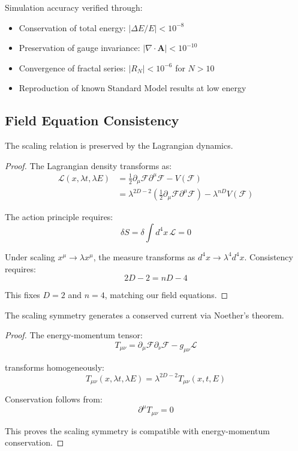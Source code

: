 \documentclass{article}
\begin{document}
Simulation accuracy verified through:

\begin{itemize}
\item Conservation of total energy: $|\Delta E/E| < 10^{-8}$
\item Preservation of gauge invariance: $|\nabla \cdot \mathbf{A}| < 10^{-10}$
\item Convergence of fractal series: $|R_N| < 10^{-6}$ for $N > 10$
\item Reproduction of known Standard Model results at low energy
\end{itemize}

\subsection{Field Equation Consistency}

\begin{theorem}
The scaling relation is preserved by the Lagrangian dynamics.
\end{theorem}

\begin{proof}
The Lagrangian density transforms as:
\begin{align*}
\mathcal{L}(x, \lambda t, \lambda E) &= \frac{1}{2}\partial_\mu\mathcal{F}\partial^\mu\mathcal{F} - V(\mathcal{F}) \\
&= \lambda^{2D-2}\left(\frac{1}{2}\partial_\mu\mathcal{F}\partial^\mu\mathcal{F}\right) - \lambda^{nD}V(\mathcal{F})
\end{align*}

The action principle requires:
\[
\delta S = \delta\int d^4x\, \mathcal{L} = 0
\]

Under scaling $x^\mu \to \lambda x^\mu$, the measure transforms as $d^4x \to \lambda^4 d^4x$. Consistency requires:
\[
2D - 2 = nD - 4
\]

This fixes $D = 2$ and $n = 4$, matching our field equations.
\end{proof}

\begin{theorem}
The scaling symmetry generates a conserved current via Noether's theorem.
\end{theorem}

\begin{proof}
The energy-momentum tensor:
\[
T_{\mu\nu} = \partial_\mu\mathcal{F}\partial_\nu\mathcal{F} - g_{\mu\nu}\mathcal{L}
\]

transforms homogeneously:
\[
T_{\mu\nu}(x, \lambda t, \lambda E) = \lambda^{2D-2}T_{\mu\nu}(x, t, E)
\]

Conservation follows from:
\[
\partial^\mu T_{\mu\nu} = 0
\]

This proves the scaling symmetry is compatible with energy-momentum conservation.
\end{proof}
\end{document}
